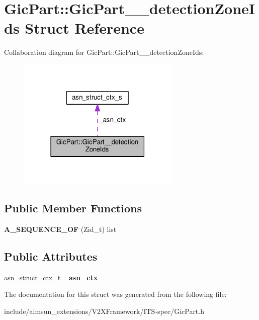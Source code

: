 \hypertarget{structGicPart_1_1GicPart____detectionZoneIds}{}\section{Gic\+Part\+:\+:Gic\+Part\+\_\+\+\_\+detection\+Zone\+Ids Struct Reference}
\label{structGicPart_1_1GicPart____detectionZoneIds}


Collaboration diagram for Gic\+Part\+:\+:Gic\+Part\+\_\+\+\_\+detection\+Zone\+Ids\+:\nopagebreak
\begin{figure}[H]
\begin{center}
\leavevmode
\includegraphics[width=219pt]{structGicPart_1_1GicPart____detectionZoneIds__coll__graph}
\end{center}
\end{figure}
\subsection*{Public Member Functions}
\begin{DoxyCompactItemize}
\item 
{\bfseries A\+\_\+\+S\+E\+Q\+U\+E\+N\+C\+E\+\_\+\+OF} (Zid\+\_\+t) list\hypertarget{structGicPart_1_1GicPart____detectionZoneIds_a38c810e2c473f10c40d6d9e6f87c11d2}{}\label{structGicPart_1_1GicPart____detectionZoneIds_a38c810e2c473f10c40d6d9e6f87c11d2}

\end{DoxyCompactItemize}
\subsection*{Public Attributes}
\begin{DoxyCompactItemize}
\item 
\hyperlink{structasn__struct__ctx__s}{asn\+\_\+struct\+\_\+ctx\+\_\+t} {\bfseries \+\_\+asn\+\_\+ctx}\hypertarget{structGicPart_1_1GicPart____detectionZoneIds_a1b7a1d5a6ec83ec22a3a930bfe190041}{}\label{structGicPart_1_1GicPart____detectionZoneIds_a1b7a1d5a6ec83ec22a3a930bfe190041}

\end{DoxyCompactItemize}


The documentation for this struct was generated from the following file\+:\begin{DoxyCompactItemize}
\item 
include/aimsun\+\_\+extensions/\+V2\+X\+Framework/\+I\+T\+S-\/spec/Gic\+Part.\+h\end{DoxyCompactItemize}
